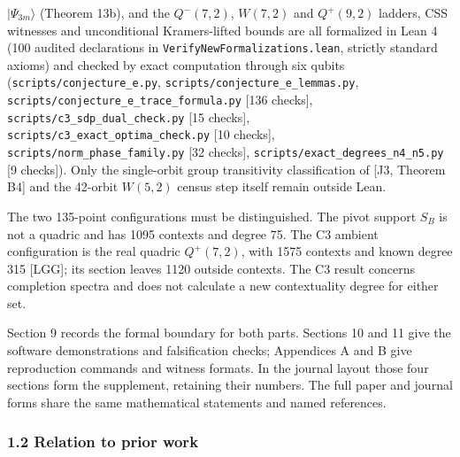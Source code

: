 \documentclass[11pt,a4paper]{article}
\begin{document}
\(|\Psi_{3m}\rangle\) (Theorem 13b), and the \(Q^-(7,2)\), \(W(7,2)\) and \(Q^+(9,2)\) ladders, CSS witnesses and
unconditional Kramers-lifted bounds are all formalized in Lean 4 (100 audited declarations in
\nolinkurl{VerifyNewFormalizations.lean}, strictly standard axioms) and checked by exact computation through six
qubits (\nolinkurl{scripts/conjecture_e.py}, \nolinkurl{scripts/conjecture_e_lemmas.py}, \nolinkurl{scripts/conjecture_e_trace_formula.py}
{[}136 checks{]}, \nolinkurl{scripts/c3_sdp_dual_check.py} {[}15 checks{]}, \nolinkurl{scripts/c3_exact_optima_check.py} {[}10 checks{]},
\nolinkurl{scripts/norm_phase_family.py} {[}32 checks{]}, \nolinkurl{scripts/exact_degrees_n4_n5.py} {[}9 checks{]}). Only the
single-orbit group transitivity classification of {[}J3, Theorem B4{]} and the 42-orbit \(W(5,2)\) census step
itself remain outside Lean.

The two 135-point configurations must be distinguished. The pivot support \(S_B\) is not a quadric and
has 1095 contexts and degree 75. The C3 ambient configuration is the real quadric \(Q^+(7,2)\), with
1575 contexts and known degree 315 {[}LGG{]}; its section leaves 1120 outside contexts. The C3 result
concerns completion spectra and does not calculate a new contextuality degree for either set.

Section 9 records the formal boundary for both parts. Sections 10 and 11 give the software
demonstrations and falsification checks; Appendices A and B give reproduction commands and witness
formats. In the journal layout those four sections form the supplement, retaining their numbers.
The full paper and journal forms share the same mathematical statements and named references.

\subsubsection{1.2 Relation to prior work}\label{12-relation-to-prior-work}
\end{document}
